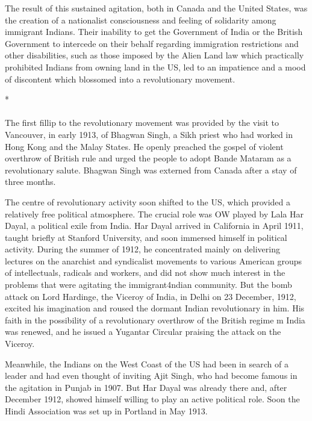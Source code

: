 The result of this sustained agitation, both in Canada and the United States, was the creation of a nationalist consciousness and feeling of solidarity among immigrant Indians. Their inability to get the Government of India or the British Government to intercede on their behalf regarding immigration restrictions and other disabilities, such as those imposed by the Alien Land law which practically prohibited Indians from owning land in the US, led to an impatience and a mood of discontent which blossomed into a revolutionary movement.

\begin{center}*\end{center}

\paragraph*{}

The first fillip to the revolutionary movement was provided by the visit to Vancouver, in early 1913, of Bhagwan Singh, a Sikh priest who had worked in Hong Kong and the Malay States. He openly preached the gospel of violent overthrow of British rule and urged the people to adopt Bande Mataram as a revolutionary salute. Bhagwan Singh was externed from Canada after a stay of three months.

The centre of revolutionary activity soon shifted to the US, which provided a relatively free political atmosphere. The crucial role was OW played by Lala Har Dayal, a political exile from India. Har Dayal arrived in California in April 1911, taught briefly at Stanford University, and soon immersed himself in political activity. During the summer of 1912, he concentrated mainly on delivering lectures on the anarchist and syndicalist movements to various American groups of intellectuals, radicals and workers, and did not show much interest in the problems that were agitating the immigrant4ndian community. But the bomb attack on Lord Hardinge, the Viceroy of India, in Delhi on 23 December, 1912, excited his imagination and roused the dormant Indian revolutionary in him. His faith in the possibility of a revolutionary overthrow of the British regime m India was renewed, and he issued a Yugantar Circular praising the attack on the Viceroy.

Meanwhile, the Indians on the West Coast of the US had been in search of a leader and had even thought of inviting Ajit Singh, who had become famous in the agitation in Punjab in 1907. But Har Dayal was already there and, after December 1912, showed himself willing to play an active political role. Soon the Hindi Association was set up in Portland in May 1913.

